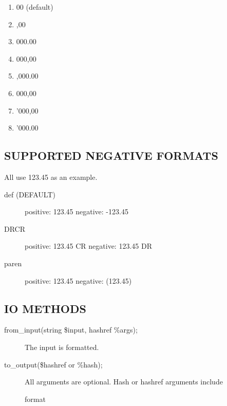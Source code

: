 \begin{description}
\begin{description}
\begin{description}
\begin{description}
\begin{description}
\begin{description}
\begin{description}
\begin{description}
\begin{description}
\begin{description}
\begin{enumerate}
\item 00 (default)
\item ,00
\item 000.00
\item 000,00
\item ,000.00
\item 000,00
\item '000,00
\item '000.00\end{enumerate}
\subsection*{SUPPORTED NEGATIVE FORMATS\label{LedgerSMB::PGNumeric_SUPPORTED_NEGATIVE_FORMATS}}


All use 123.45 as an example.

\begin{description}

\item[{def (DEFAULT)}] \mbox{}

positive:  123.45
negative: -123.45


\item[{DRCR}] \mbox{}

positive:  123.45 CR
negative:  123.45 DR


\item[{paren}] \mbox{}

positive:  123.45
negative: (123.45)

\end{description}
\subsection*{IO METHODS\label{LedgerSMB::PGNumeric_IO_METHODS}}
\begin{description}

\item[{from\_input(string \$input, hashref \%args);}] \mbox{}

The input is formatted.


\item[{to\_output(\$hashref or \%hash);}] \mbox{}

All arguments are optional.  Hash or hashref arguments include

\begin{description}

\item[{format}] \mbox{}


\end{description}
\end{description}
\end{description}
\end{description}
\end{description}
\end{description}
\end{description}
\end{description}
\end{description}
\end{description}
\end{description}
\end{description}
